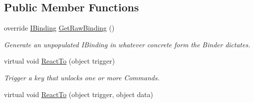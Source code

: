 \subsection*{Public Member Functions}
\begin{DoxyCompactItemize}
\item 
\hypertarget{classstrange_1_1extensions_1_1command_1_1impl_1_1_command_binder_a44d4f67e036ad79c90f95143e2972299}{override \hyperlink{interfacestrange_1_1framework_1_1api_1_1_i_binding}{I\-Binding} \hyperlink{classstrange_1_1extensions_1_1command_1_1impl_1_1_command_binder_a44d4f67e036ad79c90f95143e2972299}{Get\-Raw\-Binding} ()}\label{classstrange_1_1extensions_1_1command_1_1impl_1_1_command_binder_a44d4f67e036ad79c90f95143e2972299}

\begin{DoxyCompactList}\small\item\em Generate an unpopulated I\-Binding in whatever concrete form the Binder dictates. \end{DoxyCompactList}\item 
\hypertarget{classstrange_1_1extensions_1_1command_1_1impl_1_1_command_binder_a446f1cd5636b830764050fc472c38b51}{virtual void \hyperlink{classstrange_1_1extensions_1_1command_1_1impl_1_1_command_binder_a446f1cd5636b830764050fc472c38b51}{React\-To} (object trigger)}\label{classstrange_1_1extensions_1_1command_1_1impl_1_1_command_binder_a446f1cd5636b830764050fc472c38b51}

\begin{DoxyCompactList}\small\item\em Trigger a key that unlocks one or more Commands. \end{DoxyCompactList}\item 
\hypertarget{classstrange_1_1extensions_1_1command_1_1impl_1_1_command_binder_a40b47054aba067ba839f3927ea2aeff9}{virtual void \hyperlink{classstrange_1_1extensions_1_1command_1_1impl_1_1_command_binder_a40b47054aba067ba839f3927ea2aeff9}{React\-To} (object trigger, object data)}\label{classstrange_1_1extensions_1_1command_1_1impl_1_1_command_binder_a40b47054aba067ba839f3927ea2aeff9}


\end{DoxyCompactItemize}

